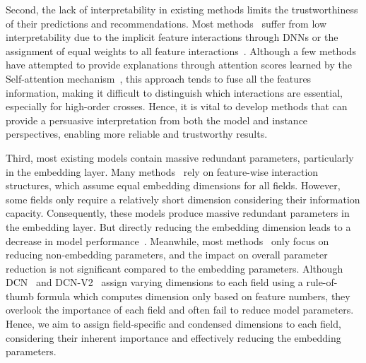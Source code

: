 \documentclass[sigconf]{acmart}
\begin{document}
Second, the lack of interpretability in existing methods limits the trustworthiness of their predictions and recommendations. Most methods~\cite{shan2016deepcrossing, qu2018product, he2017neural, guo2017deepfm, zhang2016fnn} suffer from low interpretability due to the implicit feature interactions through DNNs or the assignment of equal weights to all feature interactions~\cite{chen2021dcap, song2019autoint}. Although a few methods~\cite{chen2021dcap, song2019autoint, li2020interpretable} have attempted to provide explanations through attention scores learned by the Self-attention mechanism~\cite{vaswani2017attention}, this approach tends to fuse all the features information, making it difficult to distinguish which interactions are essential, especially for high-order crosses. Hence, it is vital to develop methods that can provide a persuasive interpretation from both the model and instance perspectives, enabling more reliable and trustworthy results.

Third, most existing models contain massive redundant parameters, particularly in the embedding layer. Many methods~\cite{rendle2012factorization, chen2021dcap, song2019autoint, lian2018xdeepfm, zhao2021fint, mao2023finalmlp, yan2023dynint} rely on feature-wise interaction structures, which assume equal embedding dimensions for all fields. However, some fields only require a relatively short dimension considering their information capacity. Consequently, these models produce massive redundant parameters in the embedding layer. But directly reducing the embedding dimension leads to a decrease in model performance~\cite{sun2020generic, song2019autoint, he2017ncf, he2017neural}. Meanwhile, most methods~\cite{tian2023directed, wang2021dcnm, yan2023dynint, zhang2022fibinet++} only focus on reducing non-embedding parameters, and the impact on overall parameter reduction is not significant compared to the embedding parameters. Although DCN~\cite{wang2017deep} and DCN-V2~\cite{wang2021dcnm} assign varying dimensions to each field using a rule-of-thumb formula which computes dimension only based on feature numbers, they overlook the importance of each field and often fail to reduce model parameters. Hence, we aim to assign field-specific and condensed dimensions to each field, considering their inherent importance and effectively reducing the embedding parameters.
\end{document}
